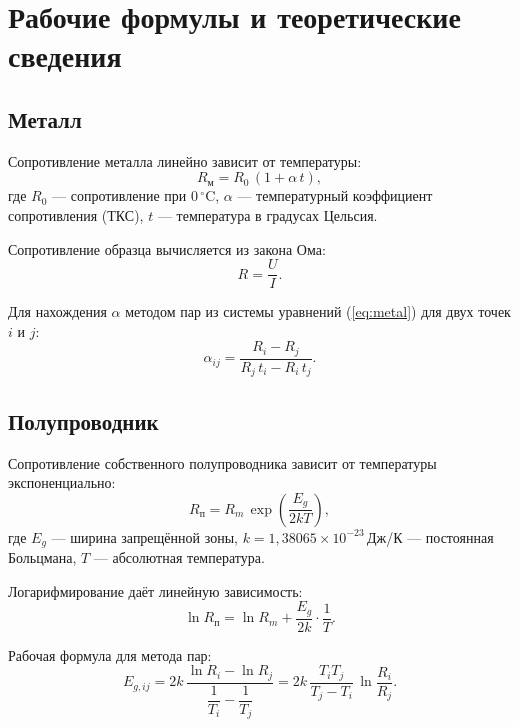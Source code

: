 \documentclass[a4paper,14pt]{article}
\begin{document}
\section{Рабочие формулы и теоретические сведения}

\subsection*{Металл}

Сопротивление металла линейно зависит от температуры:
\begin{equation}
    R_\text{м} = R_0\,(1 + \alpha\, t),
    \label{eq:metal}
\end{equation}
где $R_0$ — сопротивление при $0\,^{\circ}\mathrm{C}$, $\alpha$ — температурный коэффициент сопротивления (ТКС), $t$ — температура в градусах Цельсия.

Сопротивление образца вычисляется из закона Ома:
\begin{equation}
    R = \frac{U}{I}.
    \label{eq:ohm}
\end{equation}

Для нахождения $\alpha$ методом пар из системы уравнений (\ref{eq:metal}) для двух точек $i$ и $j$:
\begin{equation}
    \alpha_{ij} = \frac{R_i - R_j}{R_j\,t_i - R_i\,t_j}.
    \label{eq:alpha_pair}
\end{equation}

\subsection*{Полупроводник}

Сопротивление собственного полупроводника зависит от температуры экспоненциально:
\begin{equation}
    R_\text{п} = R_m\,\exp\!\left(\frac{E_g}{2kT}\right),
    \label{eq:semi}
\end{equation}
где $E_g$ — ширина запрещённой зоны, $k = 1{,}38065\times10^{-23}$\,Дж/К — постоянная Больцмана, $T$ — абсолютная температура.

Логарифмирование даёт линейную зависимость:
\begin{equation}
    \ln R_\text{п} = \ln R_m + \frac{E_g}{2k}\cdot\frac{1}{T}.
    \label{eq:semi_lin}
\end{equation}

Рабочая формула для метода пар:
\begin{equation}
    E_{g,ij} = 2k\,\frac{\ln R_i - \ln R_j}{\dfrac{1}{T_i} - \dfrac{1}{T_j}}
             = 2k\,\frac{T_i T_j}{T_j - T_i}\,\ln\frac{R_i}{R_j}.
    \label{eq:Eg_pair}
\end{equation}
\end{document}
